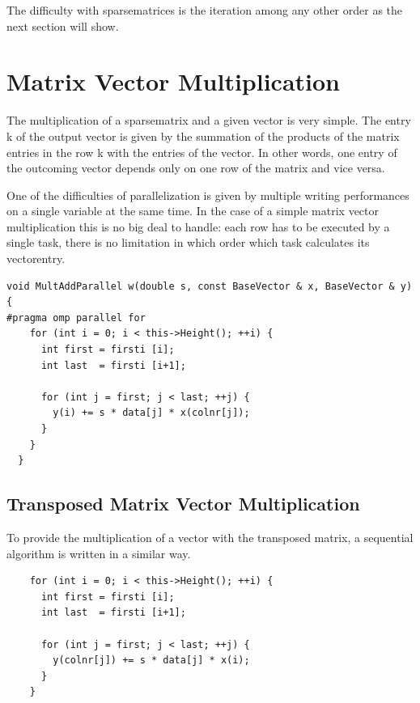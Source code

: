 \documentclass[a4paper,11pt]{scrartcl}
\begin{document}
The difficulty with sparsematrices is the iteration among any other order as
the next section will show.

\section{Matrix Vector Multiplication}
The multiplication of a sparsematrix and a given vector is very simple.
The entry k of the output vector is given by the summation of the products
of the matrix entries in the row k with the entries of the vector. In other
words, one entry of the outcoming vector depends only on one row of the matrix
and vice versa.

One of the difficulties of parallelization is given by multiple writing
performances on a single variable at the same time. In the case of a simple
matrix vector multiplication this is no big deal to handle: each row has to be
executed by a single task, there is no limitation in which order which task
calculates its vectorentry.

\begin{lstlisting}
void MultAddParallel w(double s, const BaseVector & x, BaseVector & y)
{
#pragma omp parallel for
    for (int i = 0; i < this->Height(); ++i) {
      int first = firsti [i];
      int last  = firsti [i+1];

      for (int j = first; j < last; ++j) {
        y(i) += s * data[j] * x(colnr[j]);
      }
    }
  }

\end{lstlisting}

\subsection{Transposed Matrix Vector Multiplication}
To provide the multiplication of a vector with the transposed matrix, a
sequential algorithm is written in a similar way.

\begin{lstlisting}
    for (int i = 0; i < this->Height(); ++i) {
      int first = firsti [i];
      int last  = firsti [i+1];

      for (int j = first; j < last; ++j) {
        y(colnr[j]) += s * data[j] * x(i);
      }
    }
\end{lstlisting}
\end{document}
